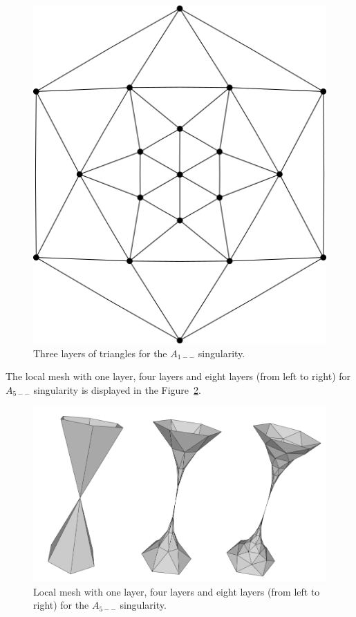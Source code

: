 \begin{figure}
    \centerline{\includegraphics[scale=0.5]{images/img52}}
    \caption[Three layers of triangles for the $A_{1--}$ singularity]
    {Three layers of triangles for the $A_{1--}$ singularity.}
    \label{img:52}
\end{figure}

The local mesh with one layer, four layers and eight layers (from left to right) 
for $A_{5--}$ singularity is displayed
in the Figure~\ref{img:53}. 
\begin{figure}
    \centerline{\includegraphics[scale=0.4]{images/img53}}
    \caption[Local mesh with layers for the $A_{5--}$ singularity]
    {Local mesh with one layer, four layers and eight layers (from left to right) 
    for the $A_{5--}$ singularity.}
    \label{img:53}
\end{figure}

